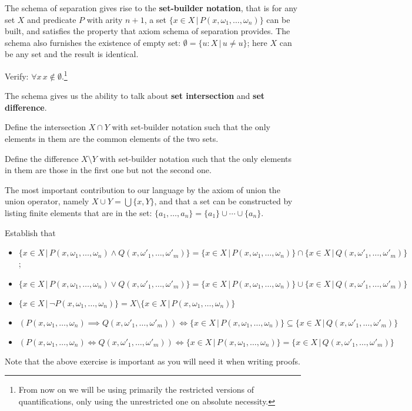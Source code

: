 \documentclass[../main.tex]{subfiles}
\begin{document}
The schema of separation gives rise to the \textbf{set-builder notation}, that is for any set $X$ and predicate $P$ with arity $n+1$, a set $\{x\in X\,|\,P(x,\omega_1,\dots,\omega_n)\}$ can be built, and satisfies the property that axiom schema of separation provides. The schema also furnishes the existence of empty set: $\emptyset=\{u:X\,|\,u\neq u\}$; here $X$ can be any set and the result is identical.
\begin{exercise}
Verify: $\forall x\,x\notin\emptyset$.\footnote{From now on we will be using primarily the restricted versions of quantifications, only using the unrestricted one on absolute necessity.}
\end{exercise}
The schema gives us the ability to talk about \textbf{set intersection} and \textbf{set difference}.
\begin{exercise}
Define the intersection $X\cap Y$ with set-builder notation such that the only elements in them are the common elements of the two sets.
\end{exercise}
\begin{exercise}
Define the difference $X\setminus Y$ with set-builder notation such that the only elements in them are those in the first one but not the second one.
\end{exercise}

The most important contribution to our language by the axiom of union the union operator, namely $X\cup Y=\bigcup\{x,Y\}$, and that a set can be constructed by listing finite elements that are in the set: $\{a_1,\dots,a_n\}=\{a_1\}\cup\cdots\cup\{a_n\}$.
\begin{exercise}
Establish that
\begin{itemize}
    \item $\{x\in X\,|\,P(x,\omega_1,\dots,\omega_n)\land Q(x,\omega'_1,\dots,\omega'_m)\}=\{x\in X\,|\,P(x,\omega_1,\dots,\omega_n)\}\cap\{x\in X\,|\,Q(x,\omega'_1,\dots,\omega'_m)\}$;
    \item $\{x\in X\,|\,P(x,\omega_1,\dots,\omega_n)\lor Q(x,\omega'_1,\dots,\omega'_m)\}=\{x\in X\,|\,P(x,\omega_1,\dots,\omega_n)\}\cup\{x\in X\,|\,Q(x,\omega'_1,\dots,\omega'_m)\}$
    \item $\{x\in X\,|\,\neg P(x,\omega_1,\dots,\omega_n)\}=X\setminus\{x\in X\,|\,P(x,\omega_1,\dots,\omega_n)\}$
    \item $(P(x,\omega_1,\dots,\omega_n)\implies Q(x,\omega'_1,\dots,\omega'_m))\iff\{x\in X\,|\,P(x,\omega_1,\dots,\omega_n)\}\subseteq\{x\in X\,|\,Q(x,\omega'_1,\dots,\omega'_m)\}$
    \item $(P(x,\omega_1,\dots,\omega_n)\iff Q(x,\omega'_1,\dots,\omega'_m))\iff\{x\in X\,|\,P(x,\omega_1,\dots,\omega_n)\}=\{x\in X\,|\,Q(x,\omega'_1,\dots,\omega'_m)\}$
\end{itemize}
\end{exercise}
Note that the above exercise is important as you will need it when writing proofs.
\end{document}
